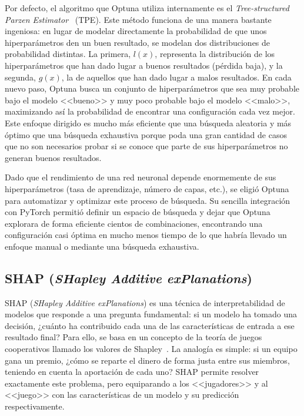 Por defecto, el algoritmo que Optuna utiliza internamente es el \textit{Tree-structured Parzen Estimator}~\cite{watanabe2023tree} (TPE). Este método funciona de una manera bastante ingeniosa: en lugar de modelar directamente la probabilidad de que unos hiperparámetros den un buen resultado, se modelan dos distribuciones de probabilidad distintas. La primera, $l(x)$, representa la distribución de los hiperparámetros que han dado lugar a buenos resultados (pérdida baja), y la segunda, $g(x)$, la de aquellos que han dado lugar a malos resultados. En cada nuevo paso, Optuna busca un conjunto de hiperparámetros que sea muy probable bajo el modelo <<bueno>> y muy poco probable bajo el modelo <<malo>>, maximizando así la probabilidad de encontrar una configuración cada vez mejor. Este enfoque dirigido es mucho más eficiente que una búsqueda aleatoria y más óptimo que una búsqueda exhaustiva porque poda una gran cantidad de casos que no son necesarios probar si se conoce que parte de sus hiperparámetros no generan buenos resultados.

Dado que el rendimiento de una red neuronal depende enormemente de sus hiperparámetros (tasa de aprendizaje, número de capas, etc.), se eligió Optuna para automatizar y optimizar este proceso de búsqueda. Su sencilla integración con PyTorch permitió definir un espacio de búsqueda y dejar que Optuna explorara de forma eficiente cientos de combinaciones, encontrando una configuración casi óptima en mucho menos tiempo de lo que habría llevado un enfoque manual o mediante una búsqueda exhaustiva.

\subsection{SHAP (\textit{SHapley Additive exPlanations})}


SHAP (\textit{SHapley Additive exPlanations}) es una técnica de interpretabilidad de modelos que responde a una pregunta fundamental: si un modelo ha tomado una decisión, ¿cuánto ha contribuido cada una de las características de entrada a ese resultado final? Para ello, se basa en un concepto de la teoría de juegos cooperativos llamado los valores de Shapley~\cite{lundberg2017unified}. La analogía es simple: si un equipo gana un premio, ¿cómo se reparte el dinero de forma justa entre sus miembros, teniendo en cuenta la aportación de cada uno? SHAP permite resolver exactamente este problema, pero equiparando a los <<jugadores>> y al <<juego>> con las características de un modelo y su predicción respectivamente.

